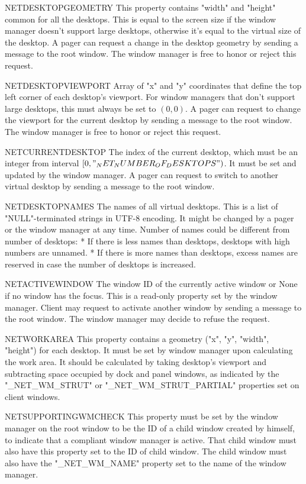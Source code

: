\heading \uns NET\uns DESKTOP\uns GEOMETRY
This property contains "width" and "height" common for all the desktops.
This is equal to the screen size if the window manager doesn't support large desktops, otherwise it's equal to the virtual size of the desktop.
A pager can request a change in the desktop geometry by sending a message to the root window.
The window manager is free to honor or reject this request.

\heading \uns NET\uns DESKTOP\uns VIEWPORT
Array of "x" and "y" coordinates that define the top left corner of each desktop's viewport.
For window managers that don't support large desktops, this must always be set to $(0,0)$.
A pager can request to change the viewport for the current desktop by sending a message to the root window.
The window manager is free to honor or reject this request.

\heading \uns NET\uns CURRENT\uns DESKTOP
The index of the current desktop, which must be an integer from interval $[0,"_NET_NUMBER_OF_DESKTOPS")$.
It must be set and updated by the window manager.
A pager can request to switch to another virtual desktop by sending a message to the root window.

\heading \uns NET\uns DESKTOP\uns NAMES
The names of all virtual desktops.
This is a list of "NULL"-terminated strings in UTF-8 encoding.
It might be changed by a pager or the window manager at any time.
Number of names could be different from number of desktops:
\begitems
* If there is less names than desktops, desktops with high numbers are unnamed.
* If there is more names than desktops, excess names are reserved in case the number of desktops is increased.
\enditems

\heading \uns NET\uns ACTIVE\uns WINDOW
The window ID of the currently active window or None if no window has the focus.
This is a read-only property set by the window manager.
Client may request to activate another window by sending a message to the root window.
The window manager may decide to refuse the request.

\heading \uns NET\uns WORKAREA
This property contains a geometry ("x", "y", "width", "height") for each desktop.
It must be set by window manager upon calculating the work area.
It should be calculated by taking desktop's viewport and subtracting space occupied by dock and panel windows,
as indicated by the "_NET_WM_STRUT" or "_NET_WM_STRUT_PARTIAL" properties set on client windows.

\heading \uns NET\uns SUPPORTING\uns WM\uns CHECK
This property must be set by the window manager on the root window to be the ID of a child window created
by himself, to indicate that a compliant window manager is active.
That child window must also have this property set to the ID of child window.
The child window must also have the "_NET_WM_NAME" property set to the name of the window manager.

